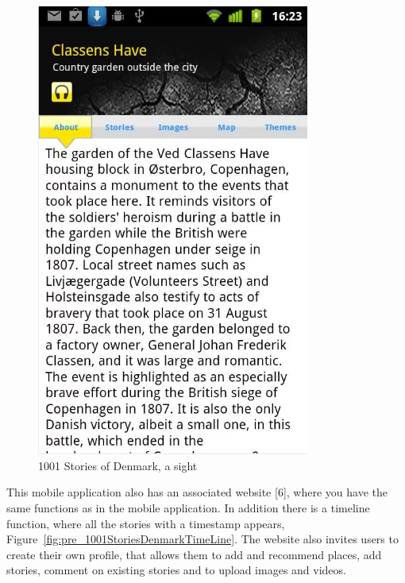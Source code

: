 \documentclass[11pt]{book}
\begin{document}
\begin{figure}[H]
      \centering
      \includegraphics[width=0.8\textwidth]{Figures/Prestudy/1001storiesStory.png}
      \caption{1001 Stories of Denmark, a sight}
      \label{fig:pre_1001StoriesDenmarkAppStory}
\end{figure}

This mobile application also has an associated website [6], where you have the same functions as in the mobile application. In addition there is a timeline function, where all the stories with a timestamp appears, Figure~\ref{fig:pre_1001StoriesDenmarkTimeLine}. The website also invites users to create their own profile, that allows them to add and recommend places, add stories, comment on existing stories and to  upload images and videos.
\end{document}
